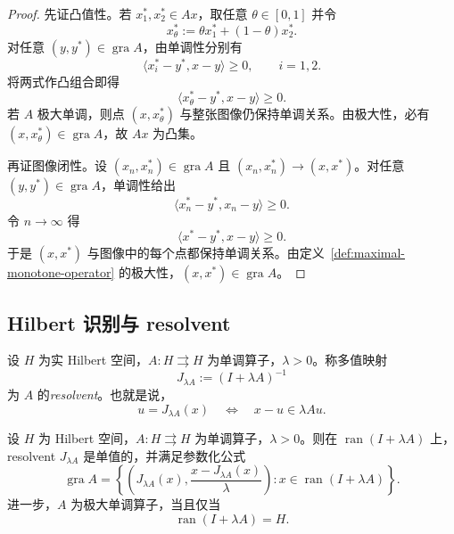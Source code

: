 \begin{proof}
先证凸值性。若 $x^\ast_1,x^\ast_2\in A x$，取任意 $\theta\in[0,1]$ 并令
\[
x^\ast_\theta:=\theta x^\ast_1+(1-\theta)x^\ast_2.
\]
对任意 $(y,y^\ast)\in \operatorname{gra} A$，由单调性分别有
\[
\langle x^\ast_i-y^\ast,x-y\rangle\ge 0,\qquad i=1,2.
\]
将两式作凸组合即得
\[
\langle x^\ast_\theta-y^\ast,x-y\rangle\ge 0.
\]
若 $A$ 极大单调，则点 $(x,x^\ast_\theta)$ 与整张图像仍保持单调关系。由极大性，必有 $(x,x^\ast_\theta)\in \operatorname{gra} A$，故 $A x$ 为凸集。

再证图像闭性。设 $(x_n,x_n^\ast)\in \operatorname{gra} A$ 且 $(x_n,x_n^\ast)\to (x,x^\ast)$。对任意 $(y,y^\ast)\in \operatorname{gra} A$，单调性给出
\[
\langle x_n^\ast-y^\ast,x_n-y\rangle\ge 0.
\]
令 $n\to\infty$ 得
\[
\langle x^\ast-y^\ast,x-y\rangle\ge 0.
\]
于是 $(x,x^\ast)$ 与图像中的每个点都保持单调关系。由定义~\ref{def:maximal-monotone-operator} 的极大性，$(x,x^\ast)\in \operatorname{gra} A$。
\end{proof}

\subsection{Hilbert 识别与 resolvent}

\begin{definition}\label{def:resolvent-monotone-operator}
设 $H$ 为实 Hilbert 空间，$A\colon H\rightrightarrows H$ 为单调算子，$\lambda>0$。称多值映射
\[
J_{\lambda A}:=(I+\lambda A)^{-1}
\]
为 $A$ 的\emph{resolvent}。也就是说，
\[
u=J_{\lambda A}(x)
\quad\Longleftrightarrow\quad
x-u\in \lambda A u.
\]
\end{definition}

\begin{theorem}\label{thm:minty-surjectivity}
设 $H$ 为 Hilbert 空间，$A\colon H\rightrightarrows H$ 为单调算子，$\lambda>0$。则在 $\operatorname{ran}(I+\lambda A)$ 上，resolvent $J_{\lambda A}$ 是单值的，并满足参数化公式
\[
\operatorname{gra} A
=
\left\{
\left(J_{\lambda A}(x),\frac{x-J_{\lambda A}(x)}{\lambda}\right):
x\in \operatorname{ran}(I+\lambda A)
\right\}.
\]
进一步，$A$ 为极大单调算子，当且仅当
\[
\operatorname{ran}(I+\lambda A)=H.
\]
\end{theorem}

